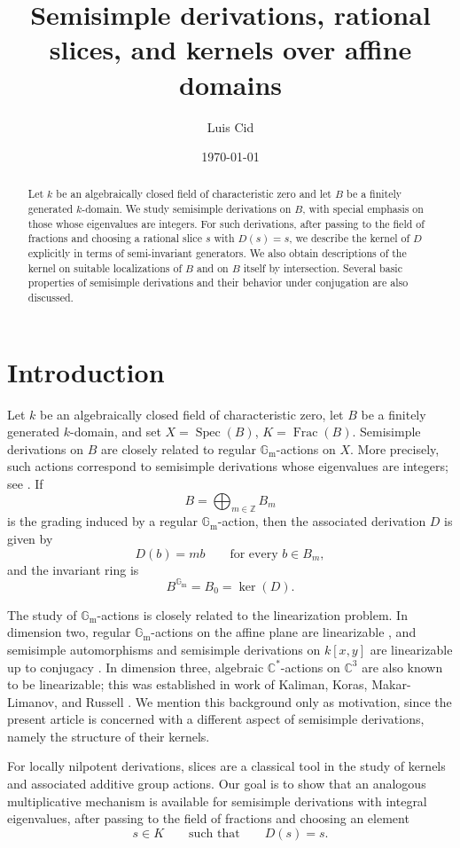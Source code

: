 \documentclass[12pt]{amsart}
\title{Semisimple derivations, rational slices, and kernels over affine domains}
\author{Luis Cid}
\date{\today}
\newcommand{\GM}{\mathbb{G}_{\mathrm{m}}}
\newcommand{\C}{\mathbb C}
\newcommand{\Z}{\mathbb Z}
\newcommand{\Spec}{\operatorname{Spec}}
\newcommand{\Frac}{\operatorname{Frac}}
\begin{document}
\begin{abstract}
Let $k$ be an algebraically closed field of characteristic zero and let $B$ be a finitely generated $k$-domain. We study semisimple derivations on $B$, with special emphasis on those whose eigenvalues are integers. For such derivations, after passing to the field of fractions and choosing a rational slice $s$ with $D(s)=s$, we describe the kernel of $D$ explicitly in terms of semi-invariant generators. We also obtain descriptions of the kernel on suitable localizations of $B$ and on $B$ itself by intersection. Several basic properties of semisimple derivations and their behavior under conjugation are also discussed.
\end{abstract}

\maketitle

\section{Introduction}

Let $k$ be an algebraically closed field of characteristic zero, let $B$ be a finitely generated $k$-domain, and set $X=\Spec(B)$, $K=\Frac(B)$.
Semisimple derivations on $B$ are closely related to regular $\GM$-actions on $X$. More precisely, such actions correspond to semisimple derivations whose eigenvalues are integers; see \cite{CiLi22}. If
\[
B=\bigoplus_{m\in \Z} B_m
\]
is the grading induced by a regular $\GM$-action, then the associated derivation $D$ is given by
\[
D(b)=m b \qquad \text{for every } b\in B_m,
\]
and the invariant ring is
\[
B^{\GM}=B_0=\ker(D).
\]

The study of $\GM$-actions is closely related to the linearization problem. In dimension two, regular $\GM$-actions on the affine plane are linearizable \cite{Gu62}, and semisimple automorphisms and semisimple derivations on $k[x,y]$ are linearizable up to conjugacy \cite{FurMa2010,Now94}. In dimension three, algebraic $\C^*$-actions on $\C^3$ are also known to be linearizable; this was established in work of Kaliman, Koras, Makar-Limanov, and Russell \cite{KKMR97}. We mention this background only as motivation, since the present article is concerned with a different aspect of semisimple derivations, namely the structure of their kernels.

For locally nilpotent derivations, slices are a classical tool in the study of kernels and associated additive group actions. Our goal is to show that an analogous multiplicative mechanism is available for semisimple derivations with integral eigenvalues, after passing to the field of fractions and choosing an element
\[
s\in K \qquad \text{such that} \qquad D(s)=s.
\]
\end{document}
